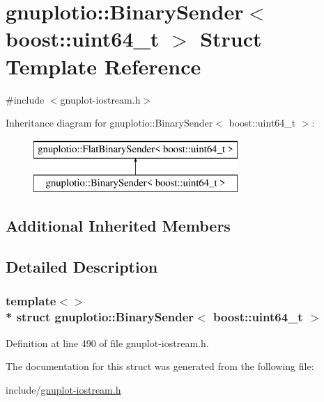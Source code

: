 \hypertarget{structgnuplotio_1_1_binary_sender_3_01boost_1_1uint64__t_01_4}{}\section{gnuplotio\+:\+:Binary\+Sender$<$ boost\+:\+:uint64\+\_\+t $>$ Struct Template Reference}
\label{structgnuplotio_1_1_binary_sender_3_01boost_1_1uint64__t_01_4}


{\ttfamily \#include $<$gnuplot-\/iostream.\+h$>$}

Inheritance diagram for gnuplotio\+:\+:Binary\+Sender$<$ boost\+:\+:uint64\+\_\+t $>$\+:\begin{figure}[H]
\begin{center}
\leavevmode
\includegraphics[height=2.000000cm]{structgnuplotio_1_1_binary_sender_3_01boost_1_1uint64__t_01_4}
\end{center}
\end{figure}
\subsection*{Additional Inherited Members}


\subsection{Detailed Description}
\subsubsection*{template$<$$>$\\*
struct gnuplotio\+::\+Binary\+Sender$<$ boost\+::uint64\+\_\+t $>$}



Definition at line 490 of file gnuplot-\/iostream.\+h.



The documentation for this struct was generated from the following file\+:\begin{DoxyCompactItemize}
\item 
include/\hyperlink{gnuplot-iostream_8h}{gnuplot-\/iostream.\+h}\end{DoxyCompactItemize}
